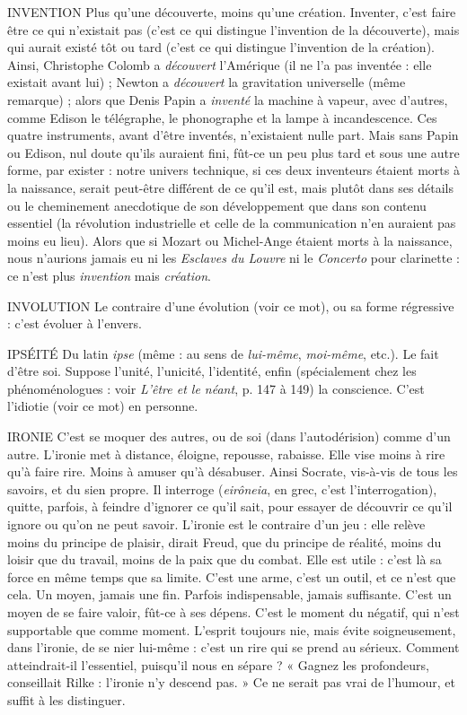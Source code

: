 {INVENTION Plus qu’une découverte, moins qu’une création. Inventer,
c'est faire être ce qui n’existait pas (c'est ce qui distingue
l'invention de la découverte), mais qui aurait existé tôt ou tard (c’est ce qui distingue
l'invention de la création). Ainsi, Christophe Colomb a {\it découvert} l'Amérique
(il ne l’a pas inventée : elle existait avant lui) ; Newton a {\it découvert} la gravitation
universelle (même remarque) ; alors que Denis Papin a {\it inventé} la
machine à vapeur, avec d’autres, comme Edison le télégraphe, le phonographe
et la lampe à incandescence. Ces quatre instruments, avant d’être inventés,
n’existaient nulle part. Mais sans Papin ou Edison, nul doute qu’ils auraient
fini, fût-ce un peu plus tard et sous une autre forme, par exister : notre univers
technique, si ces deux inventeurs étaient morts à la naissance, serait peut-être
différent de ce qu’il est, mais plutôt dans ses détails ou le cheminement anecdotique
de son développement que dans son contenu essentiel (la révolution
industrielle et celle de la communication n’en auraient pas moins eu lieu).
Alors que si Mozart ou Michel-Ange étaient morts à la naissance, nous
n’aurions jamais eu ni les {\it Esclaves du Louvre} ni le {\it Concerto} pour clarinette : ce
n'est plus {\it invention} mais {\it création}.

INVOLUTION Le contraire d’une évolution (voir ce mot), ou sa forme
régressive : c’est évoluer à l'envers.

IPSÉITÉ Du latin {\it ipse} (même : au sens de {\it lui-même}, {\it moi-même}, etc.). Le fait
d’être soi. Suppose l’unité, l’unicité, l'identité, enfin (spécialement
chez les phénoménologues : voir {\it L'être et le néant}, p. 147 à 149) la conscience.
C’est l’idiotie (voir ce mot) en personne.

IRONIE C'est se moquer des autres, ou de soi (dans l’autodérision) comme
d’un autre. L’ironie met à distance, éloigne, repousse, rabaisse.
Elle vise moins à rire qu’à faire rire. Moins à amuser qu’à désabuser. Ainsi
Socrate, vis-à-vis de tous les savoirs, et du sien propre. Il interroge ({\it eirôneia}, en
grec, c’est l'interrogation), quitte, parfois, à feindre d’ignorer ce qu’il sait, pour
essayer de découvrir ce qu’il ignore ou qu’on ne peut savoir. L’ironie est le
contraire d’un jeu : elle relève moins du principe de plaisir, dirait Freud, que
du principe de réalité, moins du loisir que du travail, moins de la paix que du
combat. Elle est utile : c’est là sa force en même temps que sa limite. C’est une
arme, c’est un outil, et ce n’est que cela. Un moyen, jamais une fin. Parfois
indispensable, jamais suffisante. C’est un moyen de se faire valoir, fût-ce à ses
dépens. C’est le moment du négatif, qui n’est supportable que comme
moment. L'esprit toujours nie, mais évite soigneusement, dans l'ironie, de se
nier lui-même : c’est un rire qui se prend au sérieux. Comment atteindrait-il
l'essentiel, puisqu'il nous en sépare ? « Gagnez les profondeurs, conseillait Rilke :
l'ironie n’y descend pas. » Ce ne serait pas vrai de l’humour, et suffit à les distinguer.

}
